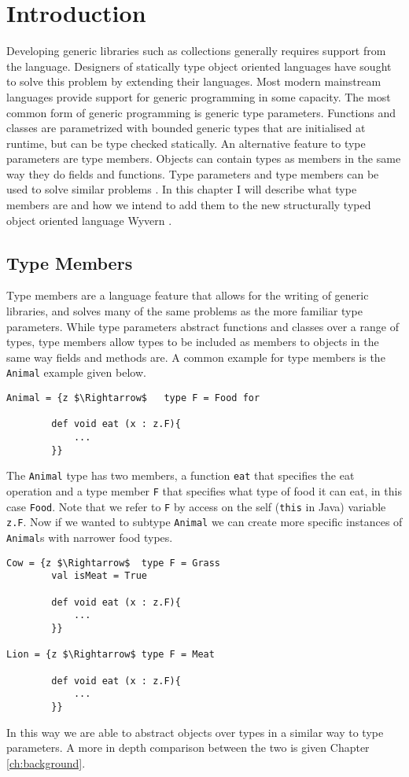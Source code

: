 \documentclass[11pt
              , a4paper
              , twoside
              , openright
              ]{report}
\numberwithin{case}{theorem}
\numberwithin{subcase}{case}
\begin{document}
\chapter{Introduction}\label{ch:intro}

Developing generic libraries such as collections generally requires support from the language. Designers of statically type object oriented languages have sought to solve this problem by extending their languages. Most modern mainstream languages provide support for generic programming in some capacity. The most common form of generic programming is generic type parameters. Functions and classes are parametrized with bounded generic types that are initialised at runtime, but can be type checked statically. An alternative feature to type parameters are type members. Objects can contain types as members in the same way they do fields and functions. Type parameters and type members can be used to solve similar problems \cite{Igarashi1999}. In this chapter I will describe what type members are and how we intend to add them to the new structurally typed object oriented language Wyvern  \cite{Nistor:2013:WST:2489828.2489830}.

\section{Type Members}
Type members are a language feature that allows for the writing of generic libraries, and solves many of the same problems as the more familiar type parameters. While type parameters abstract functions and classes over a range of types, type members allow types to be included as members to objects in the same way fields and methods are. A common example for type members is the \verb|Animal| example \cite{Igarashi1999, Amin:2014:FPT:2660193.2660216} given below.
\begin{lstlisting}[mathescape, style=customlang]
Animal = {z $\Rightarrow$	type F = Food for
		
		def void eat (x : z.F){
			...
		}}
\end{lstlisting}
The \verb|Animal| type has two members, a function \verb|eat| that specifies the eat operation and a type member \verb|F| that specifies what type of food it can eat, in this case \verb|Food|.  Note that we refer to \verb|F| by access on the self (\verb|this| in Java) variable \verb|z.F|. Now if we wanted to subtype \verb|Animal| we can create more specific instances of \verb|Animal|s with narrower food types.
\begin{lstlisting}[mathescape, style=customlang]
Cow = {z $\Rightarrow$	type F = Grass
		val isMeat = True
		
		def void eat (x : z.F){
			...
		}}

Lion = {z $\Rightarrow$	type F = Meat
		
		def void eat (x : z.F){
			...
		}}
\end{lstlisting}
In this way we are able to abstract objects over types in a similar way to type parameters. A more in depth comparison between the two is given Chapter \ref{ch:background}.
\end{document}
